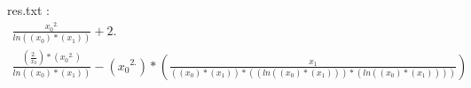 \documentclass[12pt]{article}
\begin{document}
 res.txt : \\

 \begin{gather*}
\frac{{x_{0}}^{2.}}{ln\left(\left({x_{0}}\right)*\left({x_{1}}\right)\right)}+2.
\\
\frac{\left(\frac{2.}{{x_{0}}}\right)*\left({x_{0}}^{2.}\right)}{ln\left(\left({x_{0}}\right)*\left({x_{1}}\right)\right)}-\left({x_{0}}^{2.}\right)*\left(\frac{{x_{1}}}{\left(\left({x_{0}}\right)*\left({x_{1}}\right)\right)*\left(\left(ln\left(\left({x_{0}}\right)*\left({x_{1}}\right)\right)\right)*\left(ln\left(\left({x_{0}}\right)*\left({x_{1}}\right)\right)\right)\right)}\right)
\end{gather*}
\end{document}
